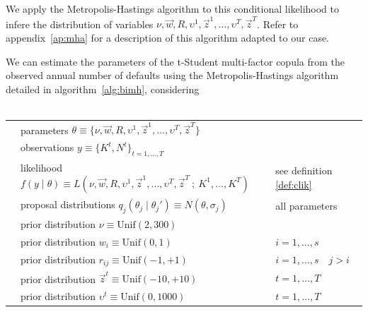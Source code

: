 \documentclass[11pt,fleqn]{book} %
\begin{document}
We apply the Metropolis-Hastings algorithm to this conditional likelihood  
to infere the distribution of variables $\nu,\vec{w},R, \upsilon^1,\vec{z}^1,
\dots,\upsilon^T,\vec{z}^T$. Refer to appendix~\ref{ap:mha} for a description 
of this algorithm adapted to our case.

\begin{proposition}
	\label{prop:pemh}
	We can estimate the parameters of the t-Student multi-factor copula from 
	the observed annual number of defaults using the Metropolis-Hastings 
	algorithm detailed in algorithm~\ref{alg:bimh}, considering
	~\\
	~\\
	\begin{listliketab} 
		\begin{tabular}{lll}
			\textbullet & parameters $\theta \equiv \{ \nu,\vec{w},R,\upsilon^1,\vec{z}^1,\dots,\upsilon^T,\vec{z}^T\}$ & \\
			\textbullet & observations $y \equiv \{K^t, N^t\}_{t=1,\dots,T}$ & \\
			\textbullet & likelihood $f(y \mid \theta) \equiv L(\nu,\vec{w},R,\upsilon^1,\vec{z}^1,\dots,\upsilon^T,\vec{z}^T\ ;\ K^1,\dots,K^T)$ & see definition \ref{def:clik} \\
			\textbullet & proposal distributions $q_j(\theta_j \mid \theta_j') \equiv N(\theta,\sigma_j)$ & all parameters\\
			\textbullet & prior distribution $\nu \equiv \text{Unif}(2,300)$ & \\
			\textbullet & prior distribution $w_i \equiv \text{Unif}(0,1)$ & $i=1,\dots,s$ \\
			\textbullet & prior distribution $r_{ij} \equiv \text{Unif}(-1,+1)$ & $i=1,\dots,s \quad j>i$ \\
			\textbullet & prior distribution $\vec{z}^t \equiv \text{Unif}(-10,+10)$ & $t=1,\dots,T$ \\
			\textbullet & prior distribution $\upsilon^t \equiv \text{Unif}(0,1000)$ & $t=1,\dots,T$ \\
		\end{tabular}
	\end{listliketab}
\end{proposition}
\end{document}
